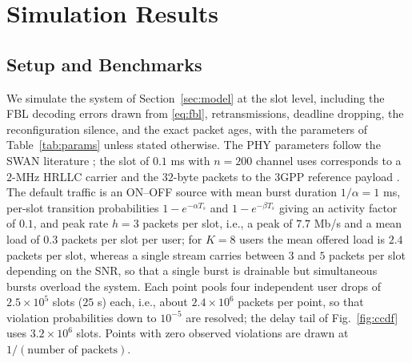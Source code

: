 \documentclass[journal]{IEEEtran}
\begin{document}
\section{Simulation Results}\label{sec:results}
\subsection{Setup and Benchmarks}
We simulate the system of Section~\ref{sec:model} at the slot level, including the FBL decoding errors drawn from \eqref{eq:fbl}, retransmissions, deadline dropping, the reconfiguration silence, and the exact packet ages, with the parameters of Table~\ref{tab:params} unless stated otherwise. The PHY parameters follow the SWAN literature \cite{Ouyang2026SWAN,Gu2026HSSA}; the slot of $0.1$ ms with $n=200$ channel uses corresponds to a $2$-MHz HRLLC carrier and the $32$-byte packets to the 3GPP reference payload \cite{3GPP-TS22261,3GPP-TS22104}. The default traffic is an ON--OFF source with mean burst duration $1/\alpha=1$ ms, per-slot transition probabilities $1-e^{-\alpha T_s}$ and $1-e^{-\beta T_s}$ giving an activity factor of $0.1$, and peak rate $h=3$ packets per slot, i.e., a peak of $7.7$ Mb/s and a mean load of $0.3$ packets per slot per user; for $K=8$ users the mean offered load is $2.4$ packets per slot, whereas a single stream carries between $3$ and $5$ packets per slot depending on the SNR, so that a single burst is drainable but simultaneous bursts overload the system. Each point pools four independent user drops of $2.5\times10^5$ slots ($25$ s) each, i.e., about $2.4\times10^6$ packets per point, so that violation probabilities down to $10^{-5}$ are resolved; the delay tail of Fig.~\ref{fig:ccdf} uses $3.2\times10^6$ slots. Points with zero observed violations are drawn at $1/(\text{number of packets})$.
\end{document}
